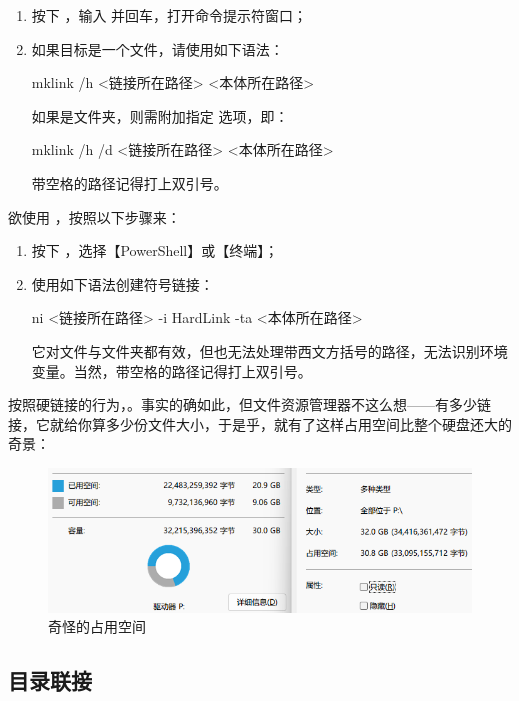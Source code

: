 {{{\begin{enumerate}
  \item 按下 ，输入  并回车，打开命令提示符窗口；
  \item 如果目标是一个文件，请使用如下语法：
    \begin{MissingVerbatim}[bat]
      mklink /h <链接所在路径> <本体所在路径>
    \end{MissingVerbatim}
    如果是文件夹，则需附加指定  选项，即：
    \begin{MissingVerbatim}[bat]
      mklink /h /d <链接所在路径> <本体所在路径>
    \end{MissingVerbatim}
    带空格的路径记得打上双引号。
\end{enumerate}

欲使用 ，按照以下步骤来：

\begin{enumerate}
  \item 按下 ，选择【PowerShell】或【终端】；
  \item 使用如下语法创建符号链接：
    \begin{MissingVerbatim}[pwsh]
      ni <链接所在路径> -i HardLink -ta <本体所在路径>
    \end{MissingVerbatim}
    它对文件与文件夹都有效，但也无法处理带西文方括号的路径，无法识别环境变量。当然，带空格的路径记得打上双引号。
\end{enumerate}

按照硬链接的行为，。事实的确如此，但文件资源管理器不这么想——有多少链接，它就给你算多少份文件大小，于是乎，就有了这样占用空间比整个硬盘还大的奇景：

\begin{figure}[htb!]
  \centering
  \includegraphics[width=.8\textwidth]{assets/advanced/Interesting_Storage_Size.png}
  \caption{奇怪的占用空间}
  \label{fig:Interesting_Storage_Size}
\end{figure}

\subsection{目录联接}

}}}
